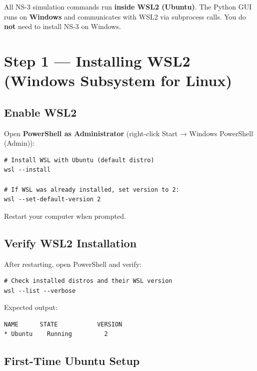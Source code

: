 \documentclass[12pt,a4paper]{article}
\newenvironment{notebox}
  {\begin{tcolorbox}[
      colback   = infoblue!8,
      colframe  = infoblue,
      fonttitle = \bfseries,
      title     = \textcolor{infoblue}{$\blacktriangleright$\; Note},
      breakable
  ]}
  {\end{tcolorbox}}
\begin{document}
\begin{notebox}
All NS-3 simulation commands run \textbf{inside WSL2 (Ubuntu)}. The Python GUI runs on \textbf{Windows} and communicates with WSL2 via subprocess calls. You do \textbf{not} need to install NS-3 on Windows.
\end{notebox}


\section{Step 1 — Installing WSL2 (Windows Subsystem for Linux)}

\subsection{Enable WSL2}

Open \textbf{PowerShell as Administrator} (right-click Start → Windows PowerShell (Admin)):

\begin{lstlisting}[style=bash, caption={Enable WSL2 — PowerShell (Administrator)}]
# Install WSL with Ubuntu (default distro)
wsl --install

# If WSL was already installed, set version to 2:
wsl --set-default-version 2
\end{lstlisting}

Restart your computer when prompted.

\subsection{Verify WSL2 Installation}

After restarting, open PowerShell and verify:

\begin{lstlisting}[style=bash, caption={Verify WSL2}]
# Check installed distros and their WSL version
wsl --list --verbose
\end{lstlisting}

Expected output:
\begin{lstlisting}[style=output]
  NAME      STATE           VERSION
* Ubuntu    Running         2
\end{lstlisting}

\subsection{First-Time Ubuntu Setup}
\end{document}
